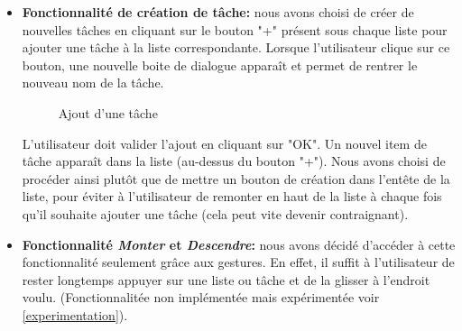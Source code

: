 \documentclass[a4paper,10pt]{article}
\begin{document}
\begin{itemize}
\item \textbf{Fonctionnalité de création de tâche:} nous avons choisi de créer de nouvelles tâches en cliquant sur le bouton "+" présent sous chaque liste pour ajouter une tâche à la liste correspondante. Lorsque l'utilisateur clique sur ce bouton, une nouvelle boite de dialogue apparaît et permet de rentrer le nouveau nom de la tâche.
\begin{figure}[H]
    \center
    \quad
    \caption{Ajout d'une tâche}
\end{figure}
L'utilisateur doit valider l'ajout en cliquant sur "OK". Un nouvel item de tâche apparaît dans la liste (au-dessus du bouton "+"). Nous avons choisi de procéder ainsi plutôt que de mettre un bouton de création dans l'entête de la liste, pour éviter à l'utilisateur de remonter en haut de la liste à chaque fois qu'il souhaite ajouter une tâche (cela peut vite devenir contraignant).
\item \textbf{Fonctionnalité \textit{Monter} et \textit{Descendre}:} nous avons décidé d'accéder à cette fonctionnalité seulement grâce aux gestures. En effet, il suffit à l'utilisateur de rester longtemps appuyer sur une liste ou tâche et de la glisser à l'endroit voulu. (Fonctionnalitée non implémentée mais expérimentée voir \ref{experimentation}).

\end{itemize}
\end{document}
